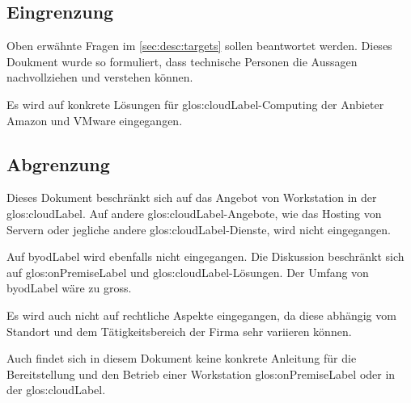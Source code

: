 \subsection{Eingrenzung}

Oben erwähnte Fragen im \cref{sec:desc:targets} sollen beantwortet werden.
Dieses Doukment wurde so formuliert, dass technische Personen die Aussagen nachvollziehen und verstehen können.

Es wird auf konkrete Lösungen für \Gls{glos:cloudLabel}-Computing der Anbieter Amazon und VMware eingegangen.

\subsection{Abgrenzung}
Dieses Dokument beschränkt sich auf das Angebot von Workstation in der \Gls{glos:cloudLabel}. Auf andere \Gls{glos:cloudLabel}-Angebote, wie das Hosting von Servern oder jegliche andere \Gls{glos:cloudLabel}-Dienste, wird nicht eingegangen.

Auf \Gls{byodLabel} wird ebenfalls nicht eingegangen. Die Diskussion beschränkt sich auf \gls{glos:onPremiseLabel} und \Gls{glos:cloudLabel}-Lösungen. Der Umfang von \Gls{byodLabel} wäre zu gross.

Es wird auch nicht auf rechtliche Aspekte eingegangen, da diese abhängig vom Standort und dem Tätigkeitsbereich der Firma sehr variieren können.

Auch findet sich in diesem Dokument keine konkrete Anleitung für die Bereitstellung und den Betrieb einer Workstation \gls{glos:onPremiseLabel} oder in der \Gls{glos:cloudLabel}.

